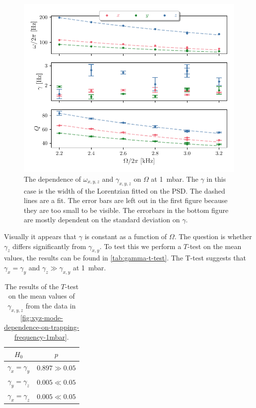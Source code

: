 \begin{figure}
    \centering
    \includegraphics{figures/data/xyz_mode_dependence_on_driving_frequency.pdf}
    \caption{The dependence of $\omega_{x,y,z}$ and $\gamma_{x,y,z}$ on $\Omega$ at \qty{1}{\milli\bar}. The $\gamma$ in this case is the width of the Lorentzian fitted on the PSD. The dashed lines are a fit. The error bars are left out in the first figure because they are too small to be visible. The errorbars in the bottom figure are mostly dependent on the standard deviation on $\gamma$.}
    \label{fig:xyz-mode-dependence-on-trapping-frequency-1mbar}
\end{figure}

Visually it appears that $\gamma$ is constant as a function of $\Omega$. The question is whether $\gamma_z$ differs significantly from $\gamma_{x,y}$. To test this we perform a $T$-test on the mean values, the results can be found in \autoref{tab:gamma-t-test}. The T-test suggests that $\gamma_x = \gamma_y$ and $\gamma_z \gg \gamma_{x,y}$ at \qty{1}{\milli\bar}.

\begin{table}
    \centering
    \begin{tabular}{cc}
        \toprule
        $H_0$ & $p$ \\
        \midrule
        $\gamma_x = \gamma_y$ & \textcolor{x_axis_color}{$0.897 \gg 0.05$} \\
        $\gamma_y = \gamma_z$ & \textcolor{y_axis_color}{$0.005 \ll 0.05$} \\
        $\gamma_x = \gamma_z$ & \textcolor{y_axis_color}{$0.005 \ll 0.05$} \\
        \bottomrule
    \end{tabular}
    \caption{The results of the $T$-test on the mean values of $\gamma_{x,y,z}$ from the data in \autoref{fig:xyz-mode-dependence-on-trapping-frequency-1mbar}.}
    \label{tab:gamma-t-test}
\end{table}

